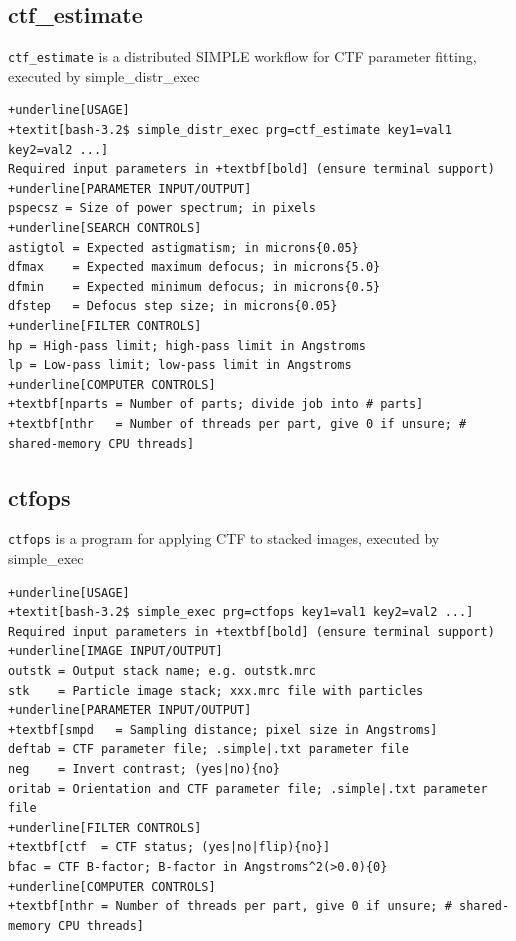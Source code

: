 \documentclass[a4paper,11pt]{article}
\newcommand{\prgname}[1]{\textcolor{NavyBlue}{\texttt{#1}}}
\begin{document}
\subsection{ctf\_estimate}
\label{ctf_estimate}
\prgname{ctf\_estimate} is a distributed SIMPLE workflow for CTF parameter fitting, executed by simple\_distr\_exec
\begin{Verbatim}[commandchars=+\[\],fontsize=\small,breaklines=true]
+underline[USAGE]
+textit[bash-3.2$ simple_distr_exec prg=ctf_estimate key1=val1 key2=val2 ...]
Required input parameters in +textbf[bold] (ensure terminal support)
+underline[PARAMETER INPUT/OUTPUT]
pspecsz = Size of power spectrum; in pixels
+underline[SEARCH CONTROLS]
astigtol = Expected astigmatism; in microns{0.05}
dfmax    = Expected maximum defocus; in microns{5.0}
dfmin    = Expected minimum defocus; in microns{0.5}
dfstep   = Defocus step size; in microns{0.05}
+underline[FILTER CONTROLS]
hp = High-pass limit; high-pass limit in Angstroms
lp = Low-pass limit; low-pass limit in Angstroms
+underline[COMPUTER CONTROLS]
+textbf[nparts = Number of parts; divide job into # parts]
+textbf[nthr   = Number of threads per part, give 0 if unsure; # shared-memory CPU threads]
\end{Verbatim}

\subsection{ctfops}
\label{ctfops}
\prgname{ctfops} is a program for applying CTF to stacked images, executed by simple\_exec
\begin{Verbatim}[commandchars=+\[\],fontsize=\small,breaklines=true]
+underline[USAGE]
+textit[bash-3.2$ simple_exec prg=ctfops key1=val1 key2=val2 ...]
Required input parameters in +textbf[bold] (ensure terminal support)
+underline[IMAGE INPUT/OUTPUT]
outstk = Output stack name; e.g. outstk.mrc
stk    = Particle image stack; xxx.mrc file with particles
+underline[PARAMETER INPUT/OUTPUT]
+textbf[smpd   = Sampling distance; pixel size in Angstroms]
deftab = CTF parameter file; .simple|.txt parameter file
neg    = Invert contrast; (yes|no){no}
oritab = Orientation and CTF parameter file; .simple|.txt parameter file
+underline[FILTER CONTROLS]
+textbf[ctf  = CTF status; (yes|no|flip){no}]
bfac = CTF B-factor; B-factor in Angstroms^2(>0.0){0}
+underline[COMPUTER CONTROLS]
+textbf[nthr = Number of threads per part, give 0 if unsure; # shared-memory CPU threads]
\end{Verbatim}
\end{document}
